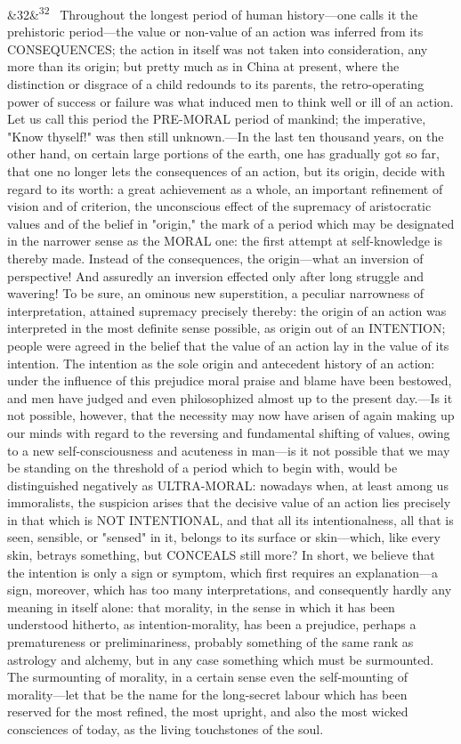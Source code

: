 \documentclass[12pt]{article}
\newcommand{\para}[1][]{\par\noindent\ifx&#1&\else\textsuperscript{\footnotesize #1}~\fi}
\begin{document}
\para[32] Throughout the longest period of human history---one calls it the prehistoric period---the value or non-value of an action was inferred from its CONSEQUENCES; the action in itself was not taken into consideration, any more than its origin; but pretty much as in China at present, where the distinction or disgrace of a child redounds to its parents, the retro-operating power of success or failure was what induced men to think well or ill of an action. Let us call this period the PRE-MORAL period of mankind; the imperative, "Know thyself!" was then still unknown.---In the last ten thousand years, on the other hand, on certain large portions of the earth, one has gradually got so far, that one no longer lets the consequences of an action, but its origin, decide with regard to its worth: a great achievement as a whole, an important refinement of vision and of criterion, the unconscious effect of the supremacy of aristocratic values and of the belief in "origin," the mark of a period which may be designated in the narrower sense as the MORAL one: the first attempt at self-knowledge is thereby made. Instead of the consequences, the origin---what an inversion of perspective! And assuredly an inversion effected only after long struggle and wavering! To be sure, an ominous new superstition, a peculiar narrowness of interpretation, attained supremacy precisely thereby: the origin of an action was interpreted in the most definite sense possible, as origin out of an INTENTION; people were agreed in the belief that the value of an action lay in the value of its intention. The intention as the sole origin and antecedent history of an action: under the influence of this prejudice moral praise and blame have been bestowed, and men have judged and even philosophized almost up to the present day.---Is it not possible, however, that the necessity may now have arisen of again making up our minds with regard to the reversing and fundamental shifting of values, owing to a new self-consciousness and acuteness in man---is it not possible that we may be standing on the threshold of a period which to begin with, would be distinguished negatively as ULTRA-MORAL: nowadays when, at least among us immoralists, the suspicion arises that the decisive value of an action lies precisely in that which is NOT INTENTIONAL, and that all its intentionalness, all that is seen, sensible, or "sensed" in it, belongs to its surface or skin---which, like every skin, betrays something, but CONCEALS still more? In short, we believe that the intention is only a sign or symptom, which first requires an explanation---a sign, moreover, which has too many interpretations, and consequently hardly any meaning in itself alone: that morality, in the sense in which it has been understood hitherto, as intention-morality, has been a prejudice, perhaps a prematureness or preliminariness, probably something of the same rank as astrology and alchemy, but in any case something which must be surmounted. The surmounting of morality, in a certain sense even the self-mounting of morality---let that be the name for the long-secret labour which has been reserved for the most refined, the most upright, and also the most wicked consciences of today, as the living touchstones of the soul.
\end{document}

